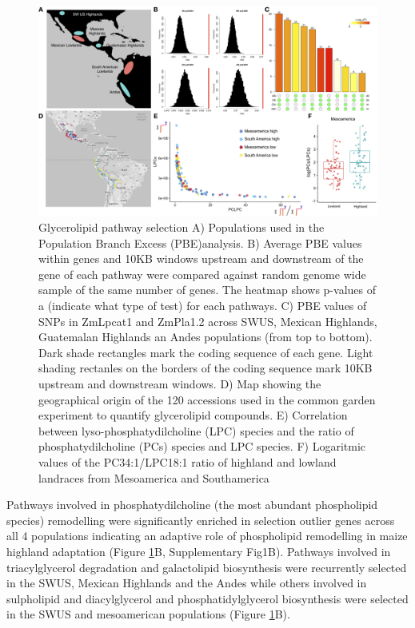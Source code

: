 \documentclass[9pt,twocolumn,twoside,lineno]{gsajnl}
\begin{document}
\begin{figure}[!ht]
\begin{center}
\includegraphics[width=0.8\paperwidth]{Figures/Fig_1.png}
\caption{Glycerolipid pathway selection 
A) Populations used in the Population Branch Excess (PBE)analysis. 
B) Average PBE values within genes and 10KB windows upstream and downstream of the gene of each pathway were compared against random genome wide sample of the same number of genes. The heatmap shows p-values of a (indicate what type of test) for each pathways. 
C) PBE values of SNPs in ZmLpcat1 and ZmPla1.2 across SWUS, Mexican Highlands, Guatemalan Highlands an Andes populations (from top to bottom). Dark shade rectangles mark the coding sequence of each gene. Light shading rectanles on the borders of the coding sequence mark 10KB upstream and downstream windows. 
D) Map showing the geographical origin of the 120 accessions used in the common garden experiment to quantify glycerolipid compounds.
E) Correlation between  lyso-phosphatydilcholine (LPC) species and the ratio of  phosphatydilcholine (PCs) species and LPC species. 
F) Logaritmic values of the PC34:1/LPC18:1 ratio of highland and lowland landraces from Mesoamerica and Southamerica}
\label{Fig1}
\end{center}
\end{figure} 
Pathways involved in phosphatydilcholine (the most abundant phospholipid species) remodelling were significantly enriched in selection outlier genes across all 4 populations indicating an adaptive role of phospholipid remodelling in maize highland adaptation (Figure \ref{Fig1}B, Supplementary Fig1B).
Pathways involved in triacylglycerol degradation and galactolipid biosynthesis were recurrently selected in the SWUS, Mexican Highlands and the Andes while others involved in sulpholipid and diacylglycerol and phosphatidylglycerol biosynthesis were selected in the SWUS and mesoamerican populations (Figure \ref{Fig1}B).
\end{document}
